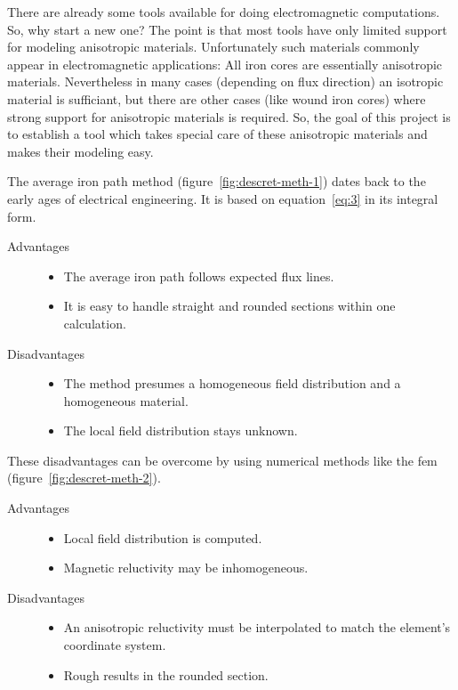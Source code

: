 There are already some tools available for doing electromagnetic
computations.  So, why start a new one?  The point is that most tools
have only limited support for modeling anisotropic materials.
Unfortunately such materials commonly appear in electromagnetic
applications: All iron cores are essentially anisotropic materials.
Nevertheless in many cases (depending on flux direction) an isotropic
material is sufficiant, but there are other cases (like wound iron
cores) where strong support for anisotropic materials is required.
So, the goal of this project is to establish a tool which takes
special care of these anisotropic materials and makes their modeling
easy. \par
The average iron path method (figure~\ref{fig:descret-meth-1}) dates
back to the early ages of electrical engineering.  It is based on
equation~\eqref{eq:3} in its integral form.
\begin{description}
\item[Advantages] 
  \begin{itemize}
  \item The average iron path follows expected flux lines.
  \item It is easy to handle straight and rounded sections within one
    calculation.
  \end{itemize}
\item[Disadvantages] 
  \begin{itemize}
  \item The method presumes a homogeneous field distribution and a
    homogeneous material.
  \item The local field distribution stays unknown.
  \end{itemize}
\end{description}
These disadvantages can be overcome by using numerical methods like
the \gls{fem} (figure~\ref{fig:descret-meth-2}).
\begin{description}
\item[Advantages] 
  \begin{itemize}
  \item Local field distribution is computed.
  \item Magnetic reluctivity may be inhomogeneous.
  \end{itemize}
\item[Disadvantages] 
  \begin{itemize}
  \item An anisotropic reluctivity must be interpolated to match the
    element's coordinate system.
  \item Rough results in the rounded section.
  \end{itemize}
\end{description}
